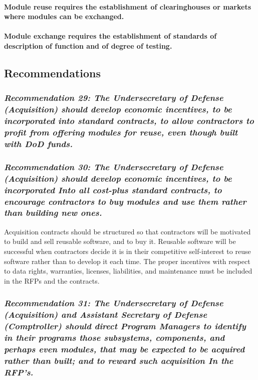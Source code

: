\documentclass[12pt,final]{article}
\begin{document}
\paragraph{Module reuse requires the establishment of clearinghouses or markets where
modules can be exchanged.}

\paragraph{Module exchange requires the establishment of standards of description of
function and of degree of testing.}

\subsection*{Recommendations}

\subsubsection*{\textit{Recommendation 29: The Undersecretary of Defense
(Acquisition) should develop economic incentives, to be incorporated into
standard contracts, to allow contractors to profit from offering modules for
reuse, even though built with DoD funds.}}

\subsubsection*{\textit{Recommendation 30: The Undersecretary of Defense
(Acquisition) should develop economic incentives, to be incorporated Into all
cost-plus standard contracts, to encourage contractors to buy modules and use
them rather than building new ones.}}

Acquisition contracts should be structured so that contractors will be
motivated to build and sell reusable software, and to buy it. Reusable software
will be successful when contractors decide it is in their competitive
self-interest to reuse software rather than to develop it each time. The proper
incentives with respect to data rights, warranties, licenses, liabilities, and
maintenance must be included in the RFPs and the contracts.

\subsubsection*{\textit{Recommendation 31: The Undersecretary of Defense
(Acquisition) and Assistant Secretary of Defense (Comp\-troller) should direct
Program Managers to identify in their programs those subsystems, components,
and perhaps even modules, that may be expected to be acquired rather than
built; and to reward such acquisition In the RFP’s.}}
\end{document}
